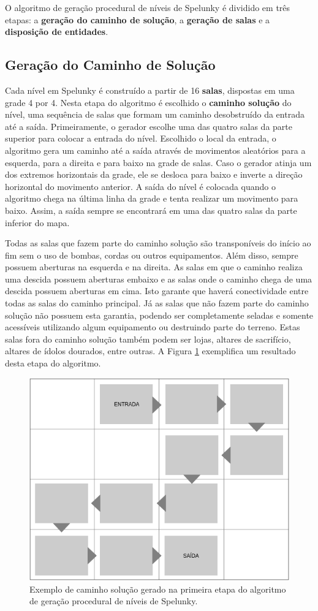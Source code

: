 O algoritmo de geração procedural de níveis de Spelunky é dividido em três
etapas: a \textbf{geração do caminho de solução}, a \textbf{geração de salas} e
a \textbf{disposição de entidades}.

\subsection{\label{section:spelunky-procgen-path}Geração do Caminho de Solução}
Cada nível em Spelunky é construído a partir de 16 \textbf{salas}, dispostas em
uma grade 4 por 4. Nesta etapa do algoritmo é escolhido o \textbf{caminho
solução} do nível, uma sequência de salas que formam um caminho desobstruído da
entrada até a saída. Primeiramente, o gerador escolhe uma das quatro salas da
parte superior para colocar a entrada do nível. Escolhido o local da entrada, o
algoritmo gera um caminho até a saída através de movimentos aleatórios para a
esquerda, para a direita e para baixo na grade de salas. Caso o gerador atinja
um dos extremos horizontais da grade, ele se desloca para baixo e inverte a
direção horizontal do movimento anterior. A saída do nível é colocada quando o
algoritmo chega na última linha da grade e tenta realizar um movimento para
baixo. Assim, a saída sempre se encontrará em uma das quatro salas da parte
inferior do mapa.

Todas as salas que fazem parte do caminho solução são transponíveis do início ao
fim sem o uso de bombas, cordas ou outros equipamentos. Além disso, sempre
possuem aberturas na esquerda e na direita. As salas em que o caminho realiza
uma descida possuem aberturas embaixo e as salas onde o caminho chega de uma
descida possuem aberturas em cima. Isto garante que haverá conectividade entre
todas as salas do caminho principal. Já as salas que não fazem parte do caminho
solução não possuem esta garantia, podendo ser completamente seladas e somente
acessíveis utilizando algum equipamento ou destruindo parte do terreno. Estas
salas fora do caminho solução também podem ser lojas, altares de sacrifício,
altares de ídolos dourados, entre outras. A Figura
\ref{fig:spelunky-procgen-path} exemplifica um resultado desta etapa do
algoritmo.

\begin{figure}[htb!]
\centering
\includegraphics[width=.65\textwidth]{fig/spelunky-procgen-path.png}
\caption{\label{fig:spelunky-procgen-path}Exemplo de caminho solução gerado na
primeira etapa do algoritmo de geração procedural de níveis de Spelunky.}
\end{figure}

